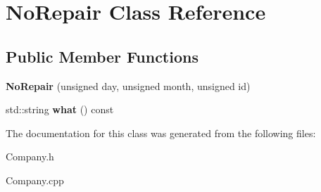 \hypertarget{class_no_repair}{}\section{No\+Repair Class Reference}
\label{class_no_repair}
\subsection*{Public Member Functions}
\begin{DoxyCompactItemize}
\item 
\mbox{\label{class_no_repair_ac57223bb7d1e2ca4d3989fe7a19ab7ea}} 
{\bfseries No\+Repair} (unsigned day, unsigned month, unsigned id)
\item 
\mbox{\label{class_no_repair_a296f67d6f20788779f2c2fe344c1e618}} 
std\+::string {\bfseries what} () const
\end{DoxyCompactItemize}


The documentation for this class was generated from the following files\+:\begin{DoxyCompactItemize}
\item 
Company.\+h\item 
Company.\+cpp\end{DoxyCompactItemize}
